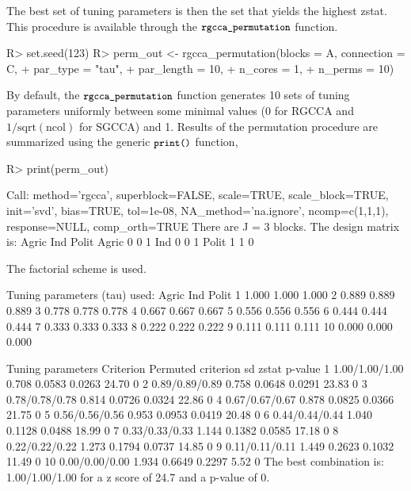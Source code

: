\documentclass[
]{jss}
\begin{document}
The best set of tuning parameters is then the set that yields the
highest zstat. This procedure is available through the
\(\small{\texttt{rgcca\_permutation}}\) function.

\footnotesize

\begin{CodeChunk}
\begin{CodeInput}
R> set.seed(123)
R> perm_out <- rgcca_permutation(blocks = A, connection = C,
+                               par_type = "tau",
+                               par_length = 10,
+                               n_cores = 1,
+                               n_perms = 10)
\end{CodeInput}
\end{CodeChunk}

\normalsize

By default, the \(\small{\texttt{rgcca\_permutation}}\) function
generates 10 sets of tuning parameters uniformly between some minimal
values (0 for RGCCA and \(1/\text{sqrt}(\text{ncol})\) for SGCCA) and 1.
Results of the permutation procedure are summarized using the generic
\(\small{\texttt{print()}}\) function,

\footnotesize

\begin{CodeChunk}
\begin{CodeInput}
R> print(perm_out)
\end{CodeInput}
\begin{CodeOutput}
Call: method='rgcca', superblock=FALSE, scale=TRUE, scale_block=TRUE, init='svd',
bias=TRUE, tol=1e-08, NA_method='na.ignore', ncomp=c(1,1,1), response=NULL,
comp_orth=TRUE 
There are J = 3 blocks.
The design matrix is:
      Agric Ind Polit
Agric     0   0     1
Ind       0   0     1
Polit     1   1     0

The factorial scheme is used.

Tuning parameters (tau) used: 
   Agric   Ind Polit
1  1.000 1.000 1.000
2  0.889 0.889 0.889
3  0.778 0.778 0.778
4  0.667 0.667 0.667
5  0.556 0.556 0.556
6  0.444 0.444 0.444
7  0.333 0.333 0.333
8  0.222 0.222 0.222
9  0.111 0.111 0.111
10 0.000 0.000 0.000

   Tuning parameters Criterion Permuted criterion     sd zstat p-value
1     1.00/1.00/1.00     0.708             0.0583 0.0263 24.70       0
2     0.89/0.89/0.89     0.758             0.0648 0.0291 23.83       0
3     0.78/0.78/0.78     0.814             0.0726 0.0324 22.86       0
4     0.67/0.67/0.67     0.878             0.0825 0.0366 21.75       0
5     0.56/0.56/0.56     0.953             0.0953 0.0419 20.48       0
6     0.44/0.44/0.44     1.040             0.1128 0.0488 18.99       0
7     0.33/0.33/0.33     1.144             0.1382 0.0585 17.18       0
8     0.22/0.22/0.22     1.273             0.1794 0.0737 14.85       0
9     0.11/0.11/0.11     1.449             0.2623 0.1032 11.49       0
10    0.00/0.00/0.00     1.934             0.6649 0.2297  5.52       0
The best combination is: 1.00/1.00/1.00 for a z score of 24.7 and a p-value of 0.
\end{CodeOutput}
\end{CodeChunk}
\end{document}
